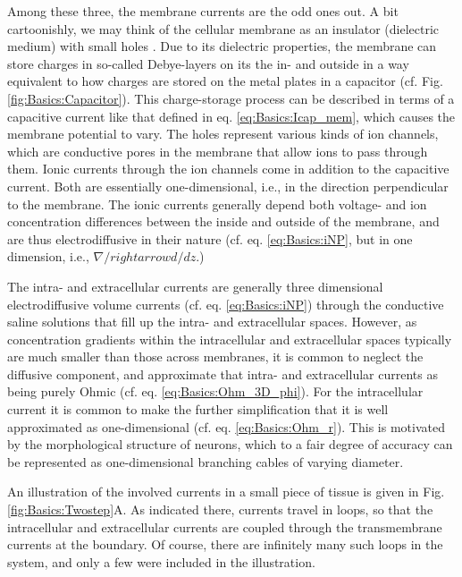Among these three, the membrane currents are the odd ones out. A bit cartoonishly, we may think of the cellular membrane as an insulator (dielectric medium) with small holes . Due to its dielectric properties, the membrane can store charges in so-called Debye-layers on its the in- and outside in a way equivalent to how charges are stored on the metal plates in a capacitor (cf. Fig.\ref{fig:Basics:Capacitor}). This charge-storage process can be described in terms of a capacitive current like that defined in eq. \ref{eq:Basics:Icap_mem}, which causes the membrane potential to vary. The holes represent various kinds of ion channels, which are conductive pores in the membrane that allow ions to pass through them. Ionic currents through the ion channels come in addition to the capacitive current. Both are essentially one-dimensional, i.e., in the direction perpendicular to the membrane. The ionic currents generally depend both voltage- and ion concentration differences between the inside and outside of the membrane, and are thus electrodiffusive in their nature (cf. eq. \ref{eq:Basics:iNP}, but in one dimension, i.e., $\nabla /rightarrow d/dz$.) 

The intra- and extracellular currents are generally three dimensional electrodiffusive volume currents (cf. eq. \ref{eq:Basics:iNP}) through the conductive saline solutions that fill up the intra- and extracellular spaces. However, as concentration gradients within the intracellular and extracellular spaces typically are much smaller than those across membranes, it is common to neglect the diffusive component, and approximate that intra- and extracellular currents as being purely Ohmic (cf. eq. \ref{eq:Basics:Ohm_3D_phi}). For the intracellular current it is common to make the further simplification that it is well approximated as one-dimensional (cf. eq. \ref{eq:Basics:Ohm_r}). This is motivated by the morphological structure of neurons, which to a fair degree of accuracy can be represented as one-dimensional branching cables of varying diameter.

An illustration of the involved currents in a small piece of tissue is given in Fig. \ref{fig:Basics:Twostep}A. As indicated there, currents travel in loops, so that the intracellular and extracellular currents are coupled through the transmembrane currents at the boundary. Of course, there are infinitely many such loops in the system, and only a few were included in the illustration. 


